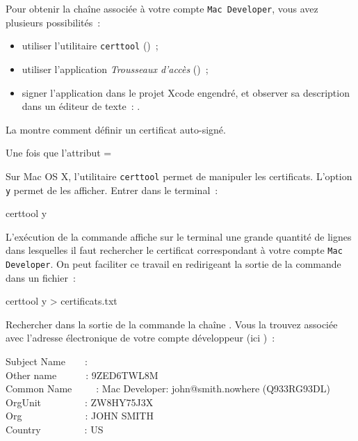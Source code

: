 Pour obtenir la chaîne associée à votre compte \texttt{Mac Developer}, vous avez plusieurs possibilités~:
\begin{itemize}
  \item utiliser l'utilitaire \texttt{certtool} ()~;
  \item utiliser l'application \emph{Trousseaux d'accès} ()~;
  \item signer l'application dans le projet Xcode engendré, et observer sa description dans un éditeur de texte~: .
\end{itemize}

La  montre comment définir un certificat auto-signé.

Une fois que l'attribut \ggsq=%


Sur Mac OS X, l'utilitaire \texttt{certtool} permet de manipuler les certificats. L'option \texttt{y} permet de les afficher. Entrer dans le terminal~:
\begin{SHELL}
certtool y
\end{SHELL}
L'exécution de la commande affiche sur le terminal une grande quantité de lignes dans lesquelles il faut rechercher le certificat correspondant à votre compte  \texttt{Mac Developer}. On peut faciliter ce travail en redirigeant la sortie de la commande dans un fichier~:
\begin{SHELL}
certtool y > certificats.txt
\end{SHELL}

Rechercher dans la sortie de la commande la chaîne . Vous la trouvez associée avec l'adresse électronique de votre compte développeur (ici )~:
\begin{SHELL}
Subject Name~~~~:\\
Other name~~~~~~: 9ZED6TWL8M\\
Common Name~~~~~: Mac Developer: john@smith.nowhere (Q933RG93DL)\\
OrgUnit~~~~~~~~~: ZW8HY75J3X\\
Org~~~~~~~~~~~~~: JOHN SMITH\\
Country~~~~~~~~~: US
\end{SHELL}

